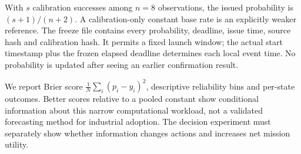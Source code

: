 \documentclass[11pt,a4paper]{article}
\begin{document}
With $s$ calibration successes among $n=8$ observations, the issued probability is $(s+1)/(n+2)$. A calibration-only constant base rate is an explicitly weaker reference. The freeze file contains every probability, deadline, issue time, source hash and calibration hash. It permits a fixed launch window; the actual start timestamp plus the frozen elapsed deadline determines each local event time. No probability is updated after seeing an earlier confirmation result.

We report Brier score $\frac1N\sum_i(p_i-y_i)^2$, descriptive reliability bins and per-state outcomes. Better scores relative to a pooled constant show conditional information about this narrow computational workload, not a validated forecasting method for industrial adoption. The decision experiment must separately show whether information changes actions and increases net mission utility.




\FloatBarrier


\clearpage


\clearpage
\appendix

\end{document}

